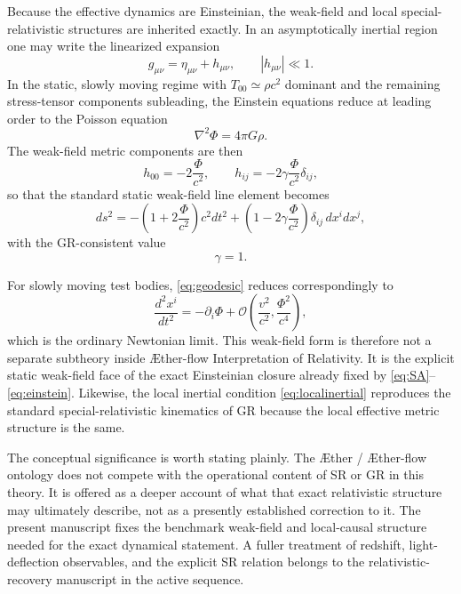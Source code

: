 \documentclass[11pt]{article}
\newcommand{\Aether}{\AE{}ther}
\newcommand{\Aflow}{\AE{}ther-flow}
\newcommand{\TheoryName}{\Aflow{} Interpretation of Relativity}
\newcommand{\Ph}{\Phi}
\begin{document}
Because the effective dynamics are Einsteinian, the weak-field and local special-relativistic structures are inherited exactly. In an asymptotically inertial region one may write the linearized expansion
\begin{equation}
g_{\mu\nu}=\eta_{\mu\nu}+h_{\mu\nu},
\qquad
|h_{\mu\nu}|\ll 1.
\label{eq:linearizedmetric}
\end{equation}
In the static, slowly moving regime with \(T_{00}\simeq \rho c^2\) dominant and the remaining stress-tensor components subleading, the Einstein equations reduce at leading order to the Poisson equation
\begin{equation}
\nabla^2 \Phi = 4\pi G \rho.
\label{eq:poisson}
\end{equation}
The weak-field metric components are then
\begin{equation}
h_{00}=-2\frac{\Phi}{c^2},
\qquad
h_{ij}=-2\gamma\frac{\Phi}{c^2}\delta_{ij},
\label{eq:hweakfield}
\end{equation}
so that the standard static weak-field line element becomes
\begin{equation}
ds^2
=
-\left(1+2\frac{\Ph}{c^2}\right)c^2dt^2
+
\left(1-2\gamma\frac{\Ph}{c^2}\right)\delta_{ij}\,dx^i dx^j,
\label{eq:weakfield}
\end{equation}
with the GR-consistent value
\begin{equation}
\gamma = 1.
\label{eq:gamma}
\end{equation}

For slowly moving test bodies, \eqref{eq:geodesic} reduces correspondingly to
\begin{equation}
\frac{d^2x^i}{dt^2}
=
-\partial_i \Phi
+ \mathcal{O}\!\left(\frac{v^2}{c^2},\frac{\Phi^2}{c^4}\right),
\label{eq:newtonianlimit}
\end{equation}
which is the ordinary Newtonian limit. This weak-field form is therefore not a separate subtheory inside \TheoryName{}. It is the explicit static weak-field face of the exact Einsteinian closure already fixed by \eqref{eq:SA}--\eqref{eq:einstein}. Likewise, the local inertial condition \eqref{eq:localinertial} reproduces the standard special-relativistic kinematics of GR because the local effective metric structure is the same.

The conceptual significance is worth stating plainly. The \Aether{} / \Aflow{} ontology does not compete with the operational content of SR or GR in this theory. It is offered as a deeper account of what that exact relativistic structure may ultimately describe, not as a presently established correction to it. The present manuscript fixes the benchmark weak-field and local-causal structure needed for the exact dynamical statement. A fuller treatment of redshift, light-deflection observables, and the explicit SR relation belongs to the relativistic-recovery manuscript in the active sequence.
\end{document}
